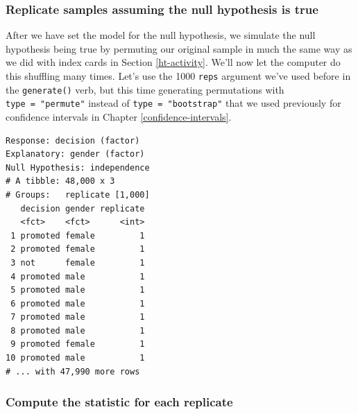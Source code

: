 \documentclass[12pt, krantz2,]{krantz}
\makeatletter
\newenvironment{Shaded}{\begin{snugshade}}{\end{snugshade}}
\newcommand{\DataTypeTok}[1]{\textcolor[rgb]{0.27,0.27,0.27}{#1}}
\newcommand{\DecValTok}[1]{\textcolor[rgb]{0.06,0.06,0.06}{#1}}
\newcommand{\KeywordTok}[1]{\textcolor[rgb]{0.27,0.27,0.27}{\textbf{#1}}}
\newcommand{\NormalTok}[1]{#1}
\newcommand{\OperatorTok}[1]{\textcolor[rgb]{0.43,0.43,0.43}{\textbf{#1}}}
\newcommand{\StringTok}[1]{\textcolor[rgb]{0.5,0.5,0.5}{#1}}
\newenvironment{kframe}{%
\medskip{}
\setlength{\fboxsep}{.8em}
 \def\at@end@of@kframe{}%
 \ifinner\ifhmode%
  \def\at@end@of@kframe{\end{minipage}}%
  \begin{minipage}{\columnwidth}%
 \fi\fi%
 \def\FrameCommand##1{\hskip\@totalleftmargin \hskip-\fboxsep
 \colorbox{shadecolor}{##1}\hskip-\fboxsep
     \hskip-\linewidth \hskip-\@totalleftmargin \hskip\columnwidth}%
 \MakeFramed {\advance\hsize-\width
   \@totalleftmargin\z@ \linewidth\hsize
   \@setminipage}}%
 {\par\unskip\endMakeFramed%
 \at@end@of@kframe}
\renewenvironment{Shaded}{\begin{kframe}}{\end{kframe}}
\makeatother
\begin{document}
\hypertarget{replicate-samples-assuming-the-null-hypothesis-is-true}{%
\subsubsection*{Replicate samples assuming the null hypothesis is true}\label{replicate-samples-assuming-the-null-hypothesis-is-true}}


After we have set the model for the null hypothesis, we simulate the null hypothesis being true by permuting our original sample in much the same way as we did with index cards in Section \ref{ht-activity}. We'll now let the computer do this shuffling many times. Let's use the 1000 \texttt{reps} argument we've used before in the \texttt{generate()} verb, but this time generating permutations with \texttt{type\ =\ "permute"} instead of \texttt{type\ =\ "bootstrap"} that we used previously for confidence intervals in Chapter \ref{confidence-intervals}.

\begin{Shaded}
\end{Shaded}

\begin{verbatim}
Response: decision (factor)
Explanatory: gender (factor)
Null Hypothesis: independence
# A tibble: 48,000 x 3
# Groups:   replicate [1,000]
   decision gender replicate
   <fct>    <fct>      <int>
 1 promoted female         1
 2 promoted female         1
 3 not      female         1
 4 promoted male           1
 5 promoted male           1
 6 promoted male           1
 7 promoted male           1
 8 promoted male           1
 9 promoted female         1
10 promoted male           1
# ... with 47,990 more rows
\end{verbatim}

\hypertarget{compute-the-statistic-for-each-replicate}{%
\subsubsection*{Compute the statistic for each replicate}\label{compute-the-statistic-for-each-replicate}}
\end{document}
